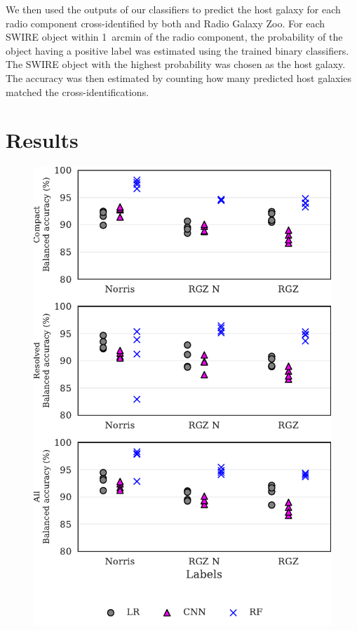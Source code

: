 \documentclass[fleqn,usenatbib,usedcolumn]{mnras}
\begin{document}
    We then used the outputs of our classifiers to predict the host galaxy for
    each radio component cross-identified by both \citet{norris06} and Radio
    Galaxy Zoo. For each SWIRE object within 1~arcmin of the radio component,
    the probability of the object having a positive label was estimated using
    the trained binary classifiers. The SWIRE object with the highest
    probability was chosen as the host galaxy. The accuracy was then estimated
    by counting how many predicted host galaxies matched the \citet{norris06}
    cross-identifications.

\section{Results}\label{results}

  \begin{figure}
  \centering
  \includegraphics[width=\columnwidth]{images/cdfs_ba_grid.pdf}

\end{figure}
\end{document}
